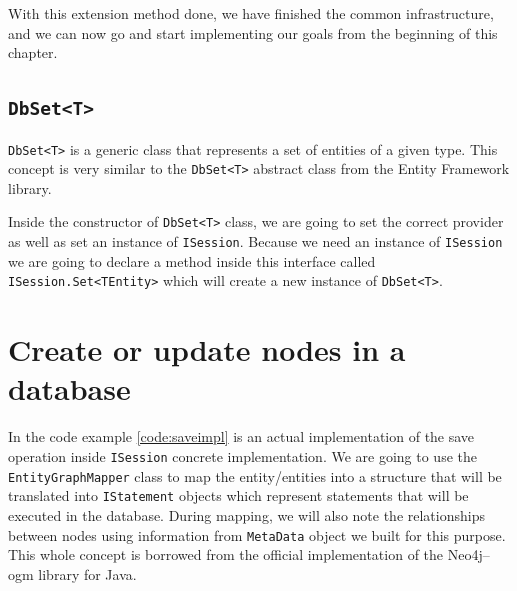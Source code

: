 With this extension method done, we have finished the common infrastructure, and we can now go and start implementing our
goals from the beginning of this chapter.

\subsection{\texttt{DbSet<T>}}

\texttt{DbSet<T>} is a generic class that represents a set of entities of a given type. This concept is very similar to the \texttt{DbSet<T>} abstract class from the Entity Framework library.

Inside the constructor of \texttt{DbSet<T>} class, we are going to set the correct provider as well as set an instance of \texttt{ISession}.
Because we need an instance of \texttt{ISession} we are going to declare a method inside this interface called
\texttt{ISession.Set<TEntity>} which will create a new instance
of \texttt{DbSet<T>}.

\section{Create or update nodes in a database}

In the code example \ref{code:saveimpl} is an actual implementation of the save operation inside \texttt{ISession} concrete implementation.
We are going to use the \texttt{EntityGraphMapper} class to map the entity/entities into a structure that will be translated into
\texttt{IStatement} objects which represent statements that will be executed in the database. During mapping, we will also note the relationships between nodes
using information from \texttt{MetaData} object we built for this purpose. This whole concept is borrowed from
the official implementation of the Neo4j--\acrshort{ogm} library for Java.


